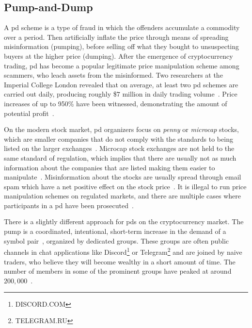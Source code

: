 \subsection{Pump-and-Dump}\label{sec:pd}
A \ac{pd} scheme is a type of fraud in which the offenders accumulate a commodity over a period. Then artificially inflate the price through means of spreading misinformation (pumping), before selling off what they bought to unsuspecting buyers at the higher price (dumping)\cite{P&D_to_the_moon}. After the emergence of cryptocurrency trading, \ac{pd} has become a popular legitimate price manipulation scheme among scammers, who leach assets from the misinformed. Two researchers at the Imperial College London revealed that on average, at least two \ac{pd} schemes are carried out daily, producing roughly \$$7$ million in daily trading volume~\cite{P&D_MIT_crypto}. Price increases of up to 950\% have been witnessed, demonstrating the amount of potential profit~\cite{P&D_cointelegraph}.



On the modern stock market, \ac{pd} organizers focus on \emph{penny} or \emph{microcap} stocks, which are smaller companies that do not comply with the standards to being listed on the larger exchanges~\cite{stock_bouraoui, stock_temple, P&D_anatomy}. Microcap stock exchanges are not held to the same standard of regulation, which implies that there are usually not as much information about the companies that are listed making them easier to manipulate~\cite{P&D_to_the_moon}. Misinformation about the stocks are usually spread through email spam which have a net positive effect on the stock price~\cite{stock_bouraoui}. It is illegal to run price manipulation schemes on regulated markets, and there are multiple cases where participants in a \ac{pd} have been prosecuted~\cite{P&D_to_the_moon}.

There is a slightly different approach for \acp{pd} on the cryptocurrency market. The pump is a coordinated, intentional, short-term increase in the demand of a symbol pair~\cite{P&D_anatomy}, organized by dedicated groups. These groups are often public channels in chat applications like Discord\footnote{DISCORD.COM} or Telegram\footnote{TELEGRAM.RU} and are joined by naive traders, who believe they will become wealthy in a short amount of time. The number of members in some of the prominent groups have peaked at around $200,000$~\cite{P&D_the_outline}.

